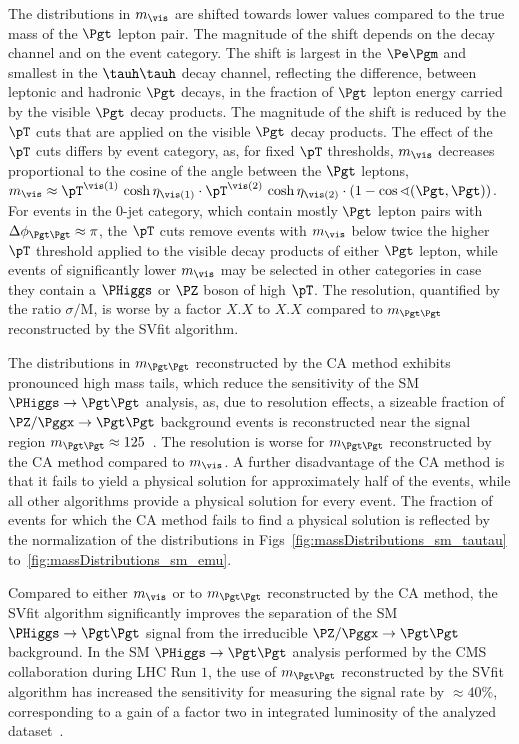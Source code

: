 {{{{The distributions in $m_{\vis}$ are shifted towards lower values compared to the true mass of the $\Pgt$ lepton pair.
The magnitude of the shift depends on the decay channel and on the event category.
The shift is largest in the $\Pe\Pgm$ and smallest in the $\tauh\tauh$ decay channel,
reflecting the difference, between leptonic and hadronic $\Pgt$ decays, in the fraction of $\Pgt$ lepton energy carried by the visible $\Pgt$ decay products.
The magnitude of the shift is reduced by the $\pT$ cuts that are applied on the visible $\Pgt$ decay products.
The effect of the $\pT$ cuts differs by event category,
as, for fixed $\pT$ thresholds, $m_{\vis}$ decreases proportional to the cosine of the angle between the $\Pgt$ leptons,
$m_{\vis} \approx \pT^{\vis(1)} \, \cosh\eta_{\vis(1)} \cdot \pT^{\vis(2)} \, \cosh\eta_{\vis(2)} \cdot \left( 1 - \cos\sphericalangle(\Pgt,\Pgt) \right)$.
For events in the $0$-jet category, which contain mostly $\Pgt$ lepton pairs with $\Delta\phi_{\Pgt\Pgt} \approx \pi$,
the $\pT$ cuts remove events with $m_{\vis}$ below twice the higher $\pT$ threshold applied to the visible decay products of either $\Pgt$ lepton,
while events of significantly lower $m_{\vis}$ may be selected in other categories in case they contain a $\PHiggs$ or $\PZ$ boson of high $\pT$.
The resolution, quantified by the ratio $\sigma/\textrm{M}$,
is worse by a factor $X.X$ to $X.X$ compared to $m_{\Pgt\Pgt}$ reconstructed by the SVfit algorithm.

The distributions in $m_{\Pgt\Pgt}$ reconstructed by the CA method
exhibits pronounced high mass tails, which reduce the sensitivity of the SM $\PHiggs \to \Pgt\Pgt$ analysis,
as, due to resolution effects, a sizeable fraction of $\PZ/\Pggx \to \Pgt\Pgt$ background events
is reconstructed near the signal region $m_{\Pgt\Pgt} \approx 125$~\GeV.
The resolution is worse for $m_{\Pgt\Pgt}$ reconstructed by the CA method compared to $m_{\vis}$.
A further disadvantage of the CA method is that it fails to yield a physical solution for approximately half of the events,
while all other algorithms provide a physical solution for every event.
The fraction of events for which the CA method fails to find a physical solution is reflected by the normalization of the distributions
in Figs~\ref{fig:massDistributions_sm_tautau} to~\ref{fig:massDistributions_sm_emu}.

Compared to either $m_{\vis}$ or to $m_{\Pgt\Pgt}$ reconstructed by the CA method,
the SVfit algorithm significantly improves the separation of the SM $\PHiggs \to \Pgt\Pgt$ signal
from the irreducible $\PZ/\Pggx \to \Pgt\Pgt$ background.
In the SM $\PHiggs \to \Pgt\Pgt$ analysis performed by the CMS collaboration during LHC Run $1$,
the use of $m_{\Pgt\Pgt}$ reconstructed by the SVfit algorithm
has increased the sensitivity for measuring the signal rate by $\approx 40\%$,
corresponding to a gain of a factor two in integrated luminosity of the analyzed dataset~\cite{HIG-13-004}.


}}}}
